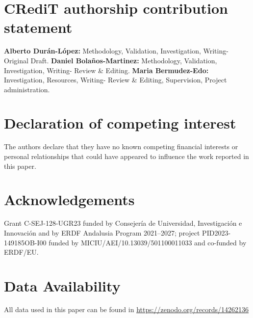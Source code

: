 \documentclass[preprint,12pt]{elsarticle}
\begin{document}
\section*{CRediT authorship contribution statement}
\textbf{Alberto Durán-López:} Methodology, Validation, Investigation, Writing- Original Draft. \textbf{Daniel Bolaños-Martinez:} Methodology, Validation, Investigation, Writing- Review \& Editing. \textbf{Maria Bermudez-Edo:} Investigation, Resources, Writing- Review \& Editing, Supervision, Project administration.

\section*{Declaration of competing interest}
The authors declare that they have no known competing financial interests or personal relationships that could have appeared to influence the work reported in this paper.

\section*{Acknowledgements}

Grant C-SEJ-128-UGR23 funded by Consejería de Universidad, Investigación e Innovación and by ERDF Andalusia Program 2021–2027; project PID2023-149185OB-I00 funded by MICIU/AEI/10.13039/501100011033 and co-funded by ERDF/EU.





\section*{Data Availability}

All data used in this paper can be found in \url{https://zenodo.org/records/14262136}

 
 


\end{document}
